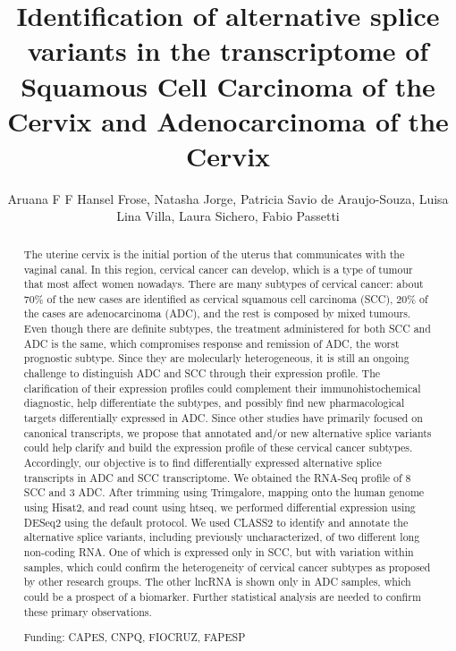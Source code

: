 \documentclass[twoside]{article}
\title{\vspace{-15mm}\fontsize{24pt}{10pt}\selectfont\textbf{ Identification of alternative splice variants in the transcriptome of  Squamous Cell Carcinoma of the Cervix and Adenocarcinoma of the Cervix }} %
\author{ Aruana F F Hansel Frose, Natasha Jorge, Patricia Savio de Araujo-Souza, Luisa Lina Villa, Laura Sichero, Fabio Passetti }
\affil{ Laboratory of Gene Expression Regulation,  Carlos Chagas Institute (ICC),  Oswaldo Cruz Foundation (Fiocruz),  Curitiba,  PR,  Brazil. }
\date{}
\begin{document}
  
  
  \maketitle %
  
  
  \thispagestyle{fancy} %
  
  
  \begin{abstract}
  The uterine cervix is the initial portion of the uterus that communicates with the vaginal canal. In this region,  cervical cancer can develop,  which is a type of tumour that most affect women nowadays. There are many subtypes of cervical cancer: about 70\% of the new cases are identified as cervical squamous cell carcinoma (SCC),  20\% of the cases are adenocarcinoma (ADC),  and the rest is composed by mixed tumours. Even though there are definite subtypes,  the treatment administered for both SCC and ADC is the same,  which compromises response and remission of ADC,  the worst prognostic subtype. Since they are molecularly heterogeneous,  it is still an ongoing challenge to distinguish ADC and SCC through their expression profile. The clarification of their expression profiles could complement their immunohistochemical diagnostic,  help differentiate the subtypes,  and possibly find new pharmacological targets differentially expressed in ADC. Since other studies have primarily focused on canonical transcripts,  we propose that annotated and/or new alternative splice variants could help clarify and build the expression profile of these cervical cancer subtypes. Accordingly,  our objective is to find differentially expressed alternative splice transcripts in ADC and SCC transcriptome. We obtained the RNA-Seq profile of 8 SCC and 3 ADC. After trimming using Trimgalore,  mapping onto the human genome using Hisat2,  and read count using htseq,  we performed differential expression using DESeq2 using the default protocol. We used CLASS2 to identify and annotate the alternative splice variants,  including previously uncharacterized,  of two different long non-coding RNA. One of which is expressed only in SCC,  but with variation within samples,  which could confirm the heterogeneity of cervical cancer subtypes as proposed by other research groups. The other lncRNA is shown only in ADC samples,  which could be a prospect of a biomarker. Further statistical analysis are needed to confirm these primary observations.
  
  Funding: CAPES,  CNPQ,  FIOCRUZ,  FAPESP \\ 
  \end{abstract}
  
\end{document}
